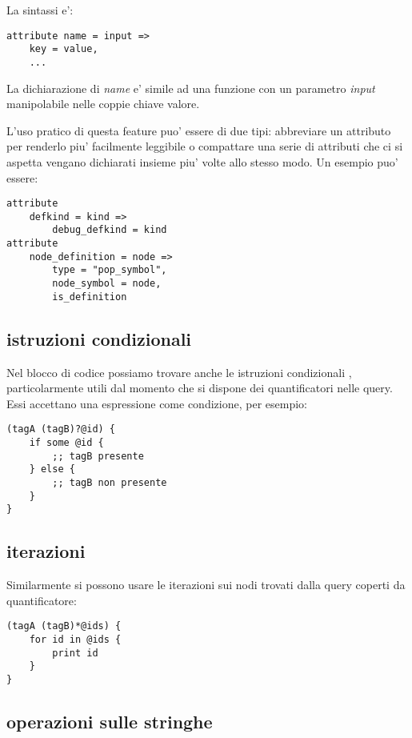 La sintassi e':

\begin{lstlisting}
attribute name = input =>
    key = value,
    ...
\end{lstlisting}

La dichiarazione di \emph{name} e' simile ad una funzione con un parametro \emph{input} manipolabile nelle coppie chiave valore.

L'uso pratico di questa feature puo' essere di due tipi: abbreviare un attributo per renderlo piu' facilmente leggibile o compattare una serie di attributi che ci si aspetta vengano dichiarati insieme piu' volte allo stesso modo. Un esempio puo' essere:

\begin{lstlisting}
attribute
    defkind = kind =>
        debug_defkind = kind
attribute
    node_definition = node =>
        type = "pop_symbol",
        node_symbol = node,
        is_definition
\end{lstlisting}

\subsection{istruzioni condizionali}

Nel blocco di codice possiamo trovare anche le istruzioni condizionali \cite{TreeSitterGraphReferenceConditionals}, particolarmente utili dal momento che si dispone dei quantificatori nelle query.
Essi accettano una espressione come condizione, per esempio:

\begin{lstlisting}
(tagA (tagB)?@id) {
    if some @id {
        ;; tagB presente
    } else {
        ;; tagB non presente
    }
}
\end{lstlisting}

\subsection{iterazioni}

Similarmente si possono usare le iterazioni \cite{TreeSitterGraphReferenceListIterations} sui nodi trovati dalla query coperti da quantificatore:

\begin{lstlisting}
(tagA (tagB)*@ids) {
    for id in @ids {
        print id
    }
}
\end{lstlisting}

\subsection{operazioni sulle stringhe}

